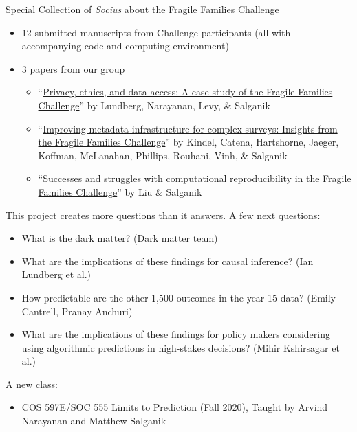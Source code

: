 \documentclass[aspectratio=169]{beamer}
\begin{document}
\begin{frame}

\href{https://journals.sagepub.com/topic/collections-srd/srd-1-fragile_families/srd}{Special Collection of \textit{Socius} about the Fragile Families Challenge}
\begin{itemize}
\item 12 submitted manuscripts from Challenge participants (all with accompanying code and computing environment) \pause
\item 3 papers from our group \pause
\begin{itemize}
\item ``\href{https://doi.org/10.1177/2378023118813023}{Privacy, ethics, and data access: A case study of the Fragile Families Challenge}'' by Lundberg, Narayanan, Levy, \& Salganik \pause
\item ``\href{https://doi.org/10.1177/2378023118817378}{Improving metadata infrastructure for complex surveys: Insights from the Fragile Families Challenge}'' by Kindel, Catena, Hartshorne, Jaeger, Koffman, McLanahan, Phillips, Rouhani, Vinh, \& Salganik \pause
\item ``\href{https://doi.org/10.1177/2378023119849803}{Successes and struggles with computational reproducibility in the Fragile Families Challenge}'' by Liu \& Salganik
\end{itemize}
\end{itemize}

\end{frame}
\begin{frame}

This project creates more questions than it answers. A few next questions: \pause
\begin{itemize}
\item What is the dark matter? (Dark matter team) \pause
\item What are the implications of these findings for causal inference? (Ian Lundberg et al.) \pause
\item How predictable are the other 1,500 outcomes in the year 15 data? (Emily Cantrell, Pranay Anchuri) \pause
\item What are the implications of these findings for policy makers considering using algorithmic predictions in high-stakes decisions? (Mihir Kshirsagar et al.) \pause
\end{itemize}
\pause
A new class:
\begin{itemize}
\item COS 597E/SOC 555 Limits to Prediction (Fall 2020), Taught by Arvind Narayanan and Matthew Salganik
\end{itemize}

\end{frame}
\end{document}

